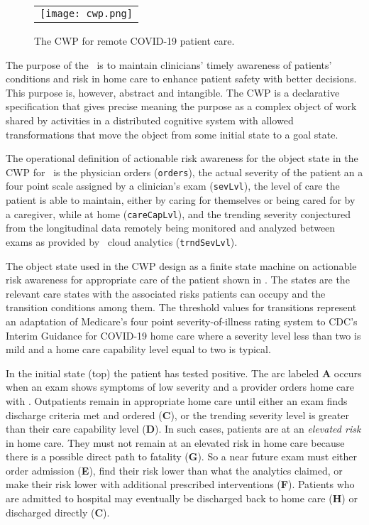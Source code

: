 \begin{figure*}[t]
  \begin{center}
    \begin{tabular}{c}
      \texttt{[image: cwp.png]}
    \end{tabular}
  \end{center}
\caption{The CWP for remote COVID-19 patient care.}
\label{fig:cwp}
\end{figure*}

The purpose of the \phware\ is to maintain clinicians' timely awareness of patients' conditions and risk in home care to enhance patient safety with better decisions. This purpose is, however, abstract and intangible. The CWP is a declarative specification that gives precise meaning the purpose as a complex object of work shared by activities in a distributed cognitive system with allowed transformations that move the object from some initial state to a goal state.

The operational definition of actionable risk awareness for the object state in the CWP for \phware\ is the physician orders (\texttt{orders}), the actual severity of the patient an a four point scale assigned by a clinician's exam (\texttt{sevLvl}), the level of care the patient is able to maintain, either by caring for themselves or being cared for by a caregiver, while at home (\texttt{careCapLvl}), and the trending severity conjectured from the longitudinal data remotely being monitored and analyzed between exams as provided by \phware\ cloud analytics (\texttt{trndSevLvl}). 

The object state used in the CWP design as a finite state machine on actionable risk awareness for appropriate care of the patient shown in .
The states are the relevant care states with the associated risks patients can occupy and the transition conditions among them. The threshold values for transitions represent an adaptation of Medicare’s four point severity-of-illness rating system to CDC’s Interim Guidance for COVID-19 home care \cite{severity,Hornbrook2005OverviewOD,cdc} where a severity level less than two is mild and a home care capability level equal to two is typical.

In the initial state (top) the patient has tested positive. The arc labeled \textbf{A} occurs when an exam shows symptoms of low severity and a provider orders home care with \phware. Outpatients remain in appropriate home care until either an exam finds discharge criteria met and ordered (\textbf{C}), or the trending severity level is greater than their care capability level (\textbf{D}). In such cases, patients are at an \emph{elevated risk} in home care. They must not remain at an elevated risk in home care because there is a possible direct path to fatality (\textbf{G}). So a near future exam must either order admission (\textbf{E}), find their risk lower than what the analytics claimed, or make their risk lower with additional prescribed interventions (\textbf{F}). Patients who are admitted to hospital may eventually be discharged back to home care (\textbf{H}) or discharged directly (\textbf{C}). 

